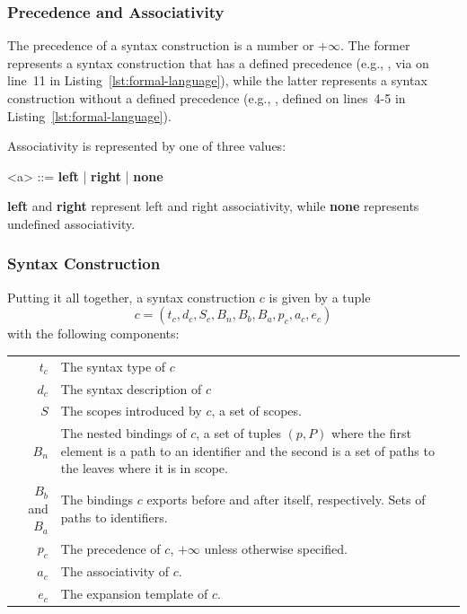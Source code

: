\documentclass{kththesis}
\newcommand{\ssynt}[1]{\ensuremath{\mathit{#1}}}
\newenvironment{sgrammar}{\begin{grammar}\renewcommand{\grammarlabel}[2]{\ssynt{##1} \hfill##2}}{\end{grammar}}
\begin{document}
\subsubsection{Precedence and Associativity}

The precedence of a syntax construction is a number or $+\infty$. The former represents a syntax construction that has a defined precedence (e.g., , via  on line~11 in Listing~\ref{lst:formal-language}), while the latter represents a syntax construction without a defined precedence (e.g., , defined on lines~4-5 in Listing~\ref{lst:formal-language}).

Associativity is represented by one of three values:

\begin{sgrammar}
<a> ::= \textbf{left} | \textbf{right} | \textbf{none}
\end{sgrammar}

\textbf{left} and \textbf{right} represent left and right associativity, while \textbf{none} represents undefined associativity.

\subsubsection{Syntax Construction}

Putting it all together, a syntax construction $c$ is given by a tuple
$$ c = (t_c, d_c, S_c, B_n, B_b, B_a, p_c, a_c, e_c) $$
with the following components:

\begin{tabular}{r|p{10cm}}
$t_c$ & The syntax type of $c$ \\
$d_c$ & The syntax description of $c$ \\
$S$ & The scopes introduced by $c$, a set of scopes. \\
$B_n$ & The nested bindings of $c$, a set of tuples $(p, P)$ where the first element is a path to an identifier and the second is a set of paths to the leaves where it is in scope. \\
$B_b$ and $B_a$ & The bindings $c$ exports before and after itself, respectively. Sets of paths to identifiers. \\
$p_c$ & The precedence of $c$, $+\infty$ unless otherwise specified. \\
$a_c$ & The associativity of $c$. \\
$e_c$ & The expansion template of $c$. \\
\end{tabular}
\end{document}

